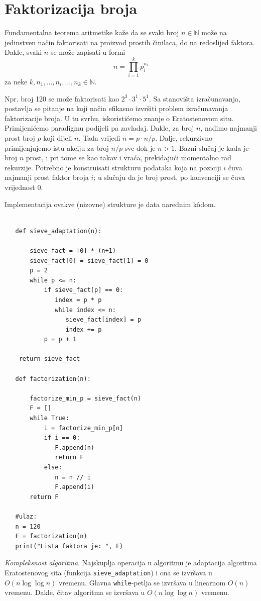 \section{Faktorizacija broja}

Fundamentalna teorema aritmetike kaže da se svaki broj $n \in \mathbb{N}$ može na jedinstven način faktorisati na proizvod prostih činilaca, do na redoslijed faktora. Dakle, svaki $n$ se može zapisati u formi
 $$n = \prod_{i=1}^k p_i^{n_i}$$
 za neke $k, n_1,\ldots, n_i, \ldots, n_k \in \mathbb{N}$.
 
 Npr. broj 120 se može faktorisati kao $2^3 \cdot 3^1 \cdot 5^1$. Sa stanovišta izračuna\-vanja, postavlja se pitanje na koji način efikasno izvršiti pro\-blem izračunava\-nja faktorizacije broja.  U tu svrhu, iskoristićemo znanje o Eratostenovom situ. Primijenićemo paradigmu podijeli pa zavladaj. Dakle, za broj $n$, nađimo najmanji prost broj $p$ koji dijeli $n$. Tada vrijedi $n = p \cdot n/p$. Dalje, rekurzivno primijenjujemo istu akciju za broj $n/p$ sve dok je $n>1$. Bazni slučaj je kada je broj $n$ prost, i pri tome se kao takav i vraća, prekidajući momentalno rad rekurzije. Potrebno je konstruisati strukturu podataka  koja na poziciji $i$ čuva najmanji prost faktor broja $i$; u slučaju da je broj prost, po konvenciji se čuva vrijednost 0.
 
 Implementacija ovakve (nizovne) strukture je data narednim k\^odom. 
 
 \begin{verbatim}
 
   def sieve_adaptation(n):
   
       sieve_fact = [0] * (n+1)
       sieve_fact[0] = sieve_fact[1] = 0
       p = 2
       while p <= n:
           if sieve_fact[p] == 0:
       		  index = p * p
       		  while index <= n:
       			 sieve_fact[index] = p
       			 index += p
           p = p + 1
 	
	return sieve_fact
 	
   def factorization(n):
       
       factorize_min_p = sieve_fact(n)
       F = []
       while True: 
           i = factorize_min_p[n]
           if i == 0: 
              F.append(n)
              return F
           else:
              n = n // i
              F.append(i)
       return F  
   
   #ulaz: 
   n = 120
   F = factorization(n)
   print("Lista faktora je: ", F)
 \end{verbatim} 
 
\textit{Kompleksnost algoritma}. Najskuplja operacija u algoritmu je ada\-ptacija algoritma Eratostenovog sita (funkcija \texttt{sieve\_adaptation}) i ona se izvršava u $O(n \log \log n)$ vremenu. Glavna \texttt{while}-petlja se izvršava u linearnom $O(n)$ vremenu. Dakle, čitav algoritma se izvršava u 
 $O(n \log \log n)$ vremenu.
 

